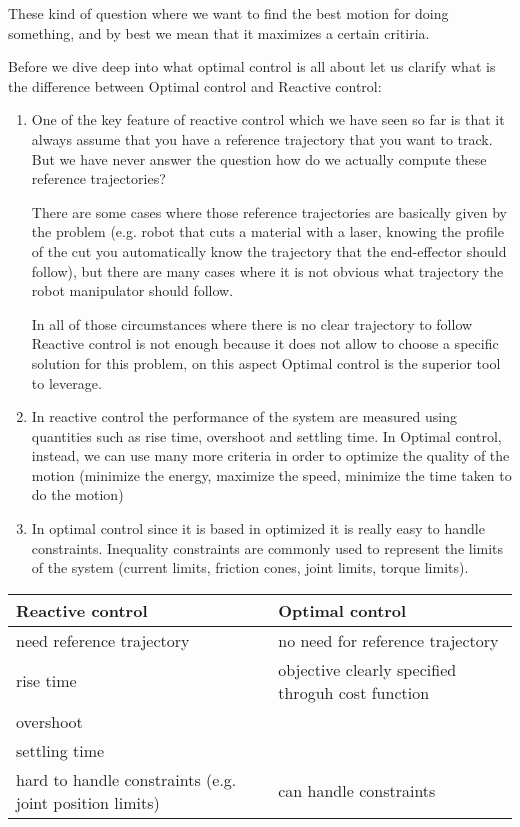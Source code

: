 These kind of question where we want to find the best motion for doing something, and by best we mean that it maximizes a certain critiria.

Before we dive deep into what optimal control is all about let us clarify what is the difference between Optimal control and Reactive control:
\begin{enumerate}
\item One of the key feature of reactive control which we have seen so far is that it always assume that you have a reference trajectory that you want to track. But we have never answer the question how do we actually compute these reference trajectories?

There are some cases where those reference trajectories are basically given by the problem (e.g. robot that cuts a material with a laser, knowing the profile of the cut you automatically know the trajectory that the end-effector should follow), but there are many cases where it is not obvious what trajectory the robot manipulator should follow.

In all of those circumstances where there is no clear trajectory to follow Reactive control is not enough because it does not allow to choose a specific solution for this problem, on this aspect Optimal control is the superior tool to leverage.

\item In reactive control the performance of the system are measured using quantities such as rise time, overshoot and settling time. In Optimal control, instead, we can use many more criteria in order to optimize the quality of the motion (minimize the energy, maximize the speed, minimize the time taken to do the motion)
\item In optimal control since it is based in optimized it is really easy to handle constraints. Inequality constraints are commonly used to represent the limits of the system (current limits, friction cones, joint limits, torque limits).
\end{enumerate}


\begin{table}[!h]
\centering
\begin{tabularx}{\textwidth}{|X|X|}
\textbf{Reactive control}&\textbf{Optimal control}\\
\toprule
need reference trajectory& no need for reference trajectory\\
rise time&objective clearly specified throguh cost function\\
overshoot&\\
settling time&\\
hard to handle constraints (e.g. joint position limits) & can handle constraints
\end{tabularx}
\end{table}

